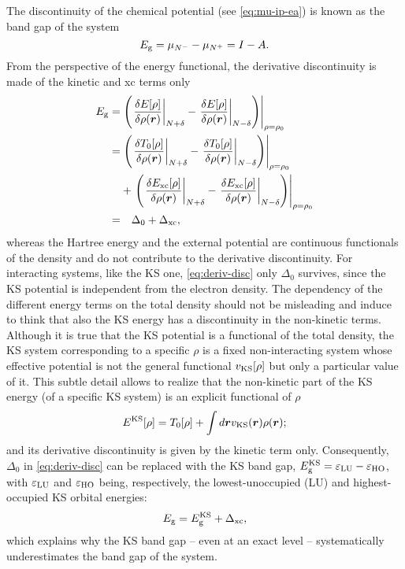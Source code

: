 The discontinuity of the chemical potential (see \cref{eq:mu-ip-ea}) is known as the band gap of the system
%
\begin{equation}
    E_{\rm g} = \mu_{N^-} - \mu_{N^+} = I - A .
    \label{eq:band-gap}
\end{equation}
%
From the perspective of the energy functional, the derivative discontinuity is made of the kinetic and xc terms only
%
\begin{equation}
    \begin{split}
    E_{\rm g} = &\left. \left( \left. \frac{\delta E[\rho]}{\delta \rho({\bm r})} \right|_{N+\delta} - \left. \frac{\delta E[\rho]}{\delta \rho({\bm r})} \right|_{N-\delta} \right) \right|_{\rho=\rho_0} \\
    = &\left. \left( \left. \frac{\delta T_0[\rho]}{\delta \rho({\bm r})} \right|_{N+\delta} - \left. \frac{\delta T_0[\rho]}{\delta \rho({\bm r})} \right|_{N-\delta} \right) \right|_{\rho=\rho_0} \\
    &+ \left. \left( \left. \frac{\delta E_{\rm xc}[\rho]}{\delta \rho({\bm r})} \right|_{N+\delta} - \left. \frac{\delta E_{\rm xc}[\rho]}{\delta \rho({\bm r})} \right|_{N-\delta} \right) \right|_{\rho=\rho_0} \\
    = &\quad \Delta_0 + \Delta_{\rm xc} ,
    \end{split}
    \label{eq:deriv-disc}
\end{equation}
%
whereas the Hartree energy and the external potential are continuous functionals of the density and do not contribute to the derivative discontinuity. For interacting systems, like the KS one, \cref{eq:deriv-disc} only $\Delta_0$ survives, since the KS potential is independent from the electron density. The dependency of the different energy terms on the total density should not be misleading and induce to think that also the KS energy has a discontinuity in the non-kinetic terms. Although it is true that the KS potential is a functional of the total density, the KS system corresponding to a specific $\rho$ is a fixed non-interacting system whose effective potential is not the general functional $v_{\rm KS}[\rho]$ but only a particular value of it. This subtle detail allows to realize that the non-kinetic part of the KS energy (of a specific KS system) is an explicit functional of $\rho$
%
\begin{equation}
    E^{\rm KS}[\rho] = T_0[\rho] + \int d{\bm r} v_{\rm KS}({\bm r}) \rho({\bm r}) ;
    \label{eq:ks-energy}
\end{equation}
%
and its derivative discontinuity is given by the kinetic term only. Consequently, $\Delta_0$ in \cref{eq:deriv-disc} can be replaced with the KS band gap, $E_{\rm g}^{\rm KS} = \varepsilon_{\rm LU} - \varepsilon_{\rm HO}$, with $\varepsilon_{\rm LU}$ and $\varepsilon_{\rm HO}$ being, respectively, the lowest-unoccupied (LU) and highest-occupied KS orbital energies:
%
\begin{equation}
    E_{\rm g} = E_{\rm g}^{\rm KS} + \Delta_{\rm xc} ,
    \label{eq:band-gap-der-disc}
\end{equation}
%
which explains why the KS band gap -- even at an exact level -- systematically underestimates the band gap of the system.


